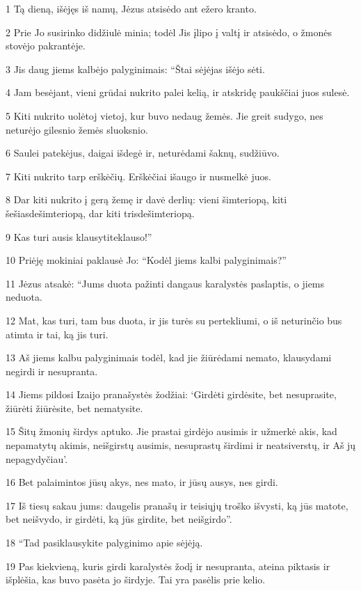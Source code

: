 \par 1 Tą dieną, išėjęs iš namų, Jėzus atsisėdo ant ežero kranto. 
\par 2 Prie Jo susirinko didžiulė minia; todėl Jis įlipo į valtį ir atsisėdo, o žmonės stovėjo pakrantėje. 
\par 3 Jis daug jiems kalbėjo palyginimais: “Štai sėjėjas išėjo sėti. 
\par 4 Jam besėjant, vieni grūdai nukrito palei kelią, ir atskridę paukščiai juos sulesė. 
\par 5 Kiti nukrito uolėtoj vietoj, kur buvo nedaug žemės. Jie greit sudygo, nes neturėjo gilesnio žemės sluoksnio. 
\par 6 Saulei patekėjus, daigai išdegė ir, neturėdami šaknų, sudžiūvo. 
\par 7 Kiti nukrito tarp erškėčių. Erškėčiai išaugo ir nusmelkė juos. 
\par 8 Dar kiti nukrito į gerą žemę ir davė derlių: vieni šimteriopą, kiti šešiasdešimteriopą, dar kiti trisdešimteriopą. 
\par 9 Kas turi ausis klausyti­teklauso!” 
\par 10 Priėję mokiniai paklausė Jo: “Kodėl jiems kalbi palyginimais?” 
\par 11 Jėzus atsakė: “Jums duota pažinti dangaus karalystės paslaptis, o jiems neduota. 
\par 12 Mat, kas turi, tam bus duota, ir jis turės su pertekliumi, o iš neturinčio bus atimta ir tai, ką jis turi. 
\par 13 Aš jiems kalbu palyginimais todėl, kad jie žiūrėdami nemato, klausydami negirdi ir nesupranta. 
\par 14 Jiems pildosi Izaijo pranašystės žodžiai: ‘Girdėti girdėsite, bet nesuprasite, žiūrėti žiūrėsite, bet nematysite. 
\par 15 Šitų žmonių širdys aptuko. Jie prastai girdėjo ausimis ir užmerkė akis, kad nepamatytų akimis, neišgirstų ausimis, nesuprastų širdimi ir neatsiverstų, ir Aš jų nepagydyčiau’. 
\par 16 Bet palaimintos jūsų akys, nes mato, ir jūsų ausys, nes girdi. 
\par 17 Iš tiesų sakau jums: daugelis pranašų ir teisiųjų troško išvysti, ką jūs matote, bet neišvydo, ir girdėti, ką jūs girdite, bet neišgirdo”. 
\par 18 “Tad pasiklausykite palyginimo apie sėjėją. 
\par 19 Pas kiekvieną, kuris girdi karalystės žodį ir nesupranta, ateina piktasis ir išplėšia, kas buvo pasėta jo širdyje. Tai yra pasėlis prie kelio. 

